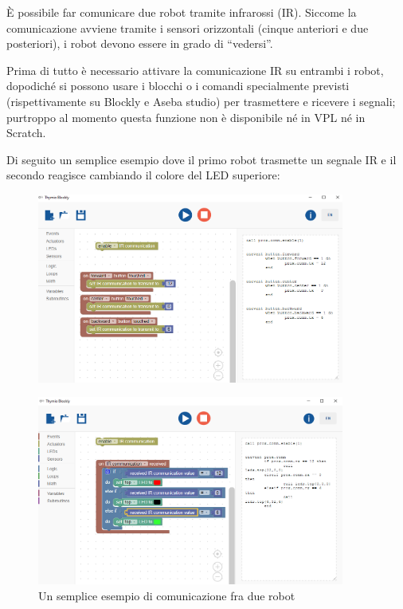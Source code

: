 \documentclass[12pt]{article}
\begin{document}
È possibile far comunicare due robot tramite infrarossi (IR). Siccome la comunicazione avviene tramite i sensori orizzontali (cinque anteriori e due posteriori), i robot devono essere in grado di ``vedersi''.

Prima di tutto è necessario attivare la comunicazione IR su entrambi i robot, dopodiché si possono usare i blocchi o i comandi specialmente previsti (rispettivamente su Blockly e Aseba studio) per trasmettere e ricevere i segnali; purtroppo al momento questa funzione non è disponibile né in VPL né in Scratch.

Di seguito un semplice esempio dove il primo robot trasmette un segnale IR e il secondo reagisce cambiando il colore del LED superiore:

\begin{figure}[H]
	\centering
	\includegraphics[width=0.9\textwidth]{img/blocklyIR1.png}
	\label{blocklyIR1}
\end{figure}

\begin{figure}[H]
	\centering
	\includegraphics[width=0.9\textwidth]{img/blocklyIR2.png}
	\caption{Un semplice esempio di comunicazione fra due robot}
	\label{blocklyIR2}
\end{figure}
\end{document}

